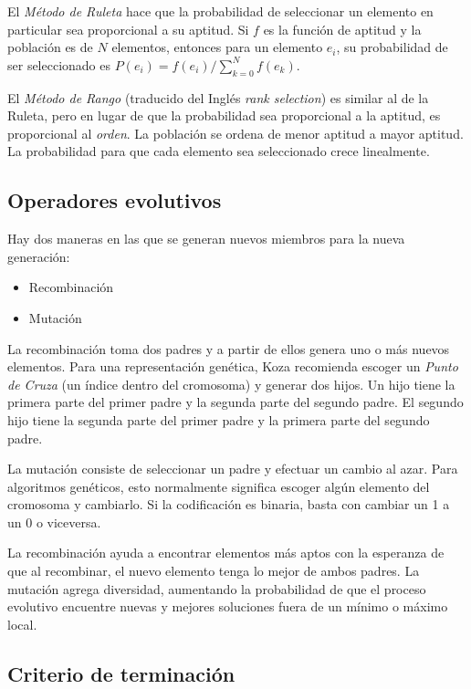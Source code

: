 El \emph{Método de Ruleta} hace que la probabilidad de seleccionar un elemento en
particular sea proporcional a su aptitud. Si $f$ es la función de aptitud y la
población es de $N$ elementos, entonces para un elemento $e_i$, su probabilidad
de ser seleccionado es $P(e_i) = f(e_i) / \sum_{k=0}^{N} f(e_k)$.

El \emph{Método de Rango} (traducido del Inglés \emph{rank selection}) es similar al
de la Ruleta, pero en lugar de que la probabilidad sea proporcional a la
aptitud, es proporcional al \emph{orden}. La población se ordena de menor
aptitud a mayor aptitud. La probabilidad para que cada elemento sea
seleccionado crece linealmente.

\subsection { Operadores evolutivos }

Hay dos maneras en las que se generan nuevos miembros para la nueva generación:

\begin{itemize}
      \item Recombinación
      \item Mutación
\end{itemize}

La recombinación toma dos padres y a partir de ellos genera uno o más nuevos
elementos. Para una representación genética, Koza \cite{koza} recomienda
escoger un \emph{Punto de Cruza} (un índice dentro del cromosoma) y generar dos
hijos. Un hijo tiene la primera parte del primer padre y la segunda parte del
segundo padre. El segundo hijo tiene la segunda parte del primer padre y la
primera parte del segundo padre.

La mutación consiste de seleccionar un padre y efectuar un cambio al azar. Para
algoritmos genéticos, esto normalmente significa escoger algún elemento del
cromosoma y cambiarlo. Si la codificación es binaria, basta con cambiar un 1 a
un 0 o viceversa.

La recombinación ayuda a encontrar elementos más aptos con la esperanza de que
al recombinar, el nuevo elemento tenga lo mejor de ambos padres. La mutación
agrega diversidad, aumentando la probabilidad de que el proceso evolutivo
encuentre nuevas y mejores soluciones fuera de un mínimo o máximo local.

\subsection { Criterio de terminación }

